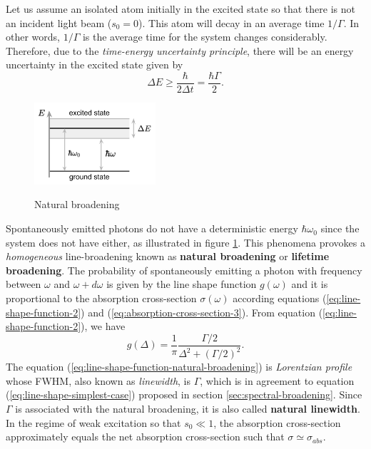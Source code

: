 Let us assume an isolated atom initially in the excited state so that there is not an incident light beam ($ s_0 = 0 $). This atom will decay in an average time $ 1/\Gamma $. In other words, $ 1 / \Gamma $ is the average time for the system changes considerably. Therefore, due to the \textit{time-energy uncertainty principle}, there will be an energy uncertainty in the excited state given by
\begin{equation}
	\Delta E \geq \frac{\hbar}{2\Delta t} = \frac{\hbar\Gamma}{2}.
\end{equation}
\begin{figure}[!ht]
	\centering
	\vspace{0pt}
	\caption{Natural broadening}
	\includegraphics[width=0.4\textwidth]{USPSC-img/natural_broadening.png}
	\vspace{5pt}
	\vspace{-10pt}
	\label{fig:natural-broadening}
\end{figure}
Spontaneously emitted photons do not have a deterministic energy $ \hbar \omega_0 $ since the system does not have either, as illustrated in figure \ref{fig:natural-broadening}. This phenomena provokes a \textit{homogeneous} line-broadening known as \textbf{natural broadening} or \textbf{lifetime broadening}. The probability of spontaneously emitting a photon with frequency between $ \omega $ and $ \omega + d\omega $ is given by the line shape function $ g(\omega) $ and it is proportional to the absorption cross-section $ \sigma(\omega) $ according equations (\ref{eq:line-shape-function-2}) and (\ref{eq:absorption-cross-section-3}). From equation (\ref{eq:line-shape-function-2}), we have
\begin{equation}
	g(\Delta) = \frac{1}{\pi} \frac{\Gamma / 2}{\Delta^2 + (\Gamma / 2)^2}.
	\label{eq:line-shape-function-natural-broadening}
\end{equation}
The equation (\ref{eq:line-shape-function-natural-broadening}) is \textit{Lorentzian profile} whose FWHM, also known as \textit{linewidth}, is $ \Gamma $, which is in agreement to equation (\ref{eq:line-shape-simplest-case}) proposed in section \ref{sec:spectral-broadening}. Since $ \Gamma $ is associated with the natural broadening, it is also called \textbf{natural linewidth}. In the regime of weak excitation so that $ s_0 \ll 1 $, the absorption cross-section approximately equals the net absorption cross-section such that $ \sigma \simeq \sigma_{abs} $.
 
